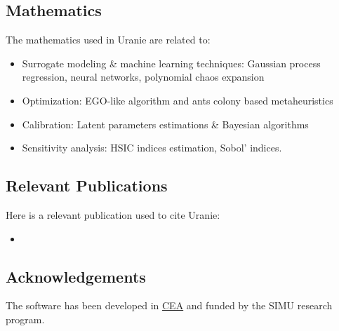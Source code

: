 \subsection{Mathematics}
\label{sec:Uranie:mathematics}
The mathematics used in Uranie are related to:
\begin{itemize}
        \item Surrogate modeling \& machine learning techniques: Gaussian process regression, neural networks, polynomial chaos expansion
        \item Optimization: EGO-like algorithm and ants colony based metaheuristics
        \item Calibration: Latent parameters estimations \& Bayesian algorithms
        \item Sensitivity analysis: HSIC indices estimation, Sobol' indices.
\end{itemize}


\subsection{Relevant Publications}
\label{sec:Uranie:publications}

Here is a relevant publication used to cite Uranie:

\begin{itemize}
   \item {}
\end{itemize}


\subsection{Acknowledgements}
\label{sec::Uranie:acknowledgements}

The software has been developed in \href{https://www.cea.fr/}{CEA} and funded by the SIMU research program.



